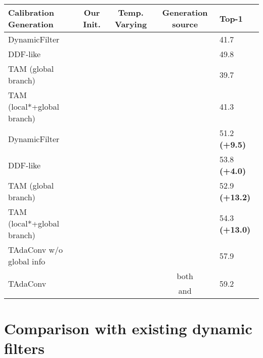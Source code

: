 \documentclass[10pt,journal,compsoc]{IEEEtran}
\newcommand{\cmark}{\color{good}\ding{51}}\newcommand{\xmark}{\color{bad}\ding{55}}
\newcommand{\tablestyle}[2]{\setlength{\tabcolsep}{#1}\renewcommand{\arraystretch}{#2}\centering\small}
\begin{document}
\begin{table*}[t]
    \tablestyle{5pt}{1.0}
\caption{{Performance comparison with other dynamic filters.
\textit{Our Init.} denotes initializing the calibration weights to ones so that the initial calibrated weights is identical to the pre-trained weights. Temp. Varying is short for temporally varying, which indicates different weights for different temporal locations (frames).
* denotes that the branch was originally not designed for generating filter or calibration weights, but we slightly modified the structure so that it can be used for calibration weight generation. \textbf{\color{forestgreen}(Numbers in brackets)} show the performance improvement brought by our initialization scheme for calibration weights.}
}
\centering
\begin{tabular}{lcccl}
\toprule
\textbf{Calibration Generation} & \textbf{Our Init.} & \textbf{Temp. Varying} & \textbf{Generation source} & \textbf{Top-1} \\
\midrule
DynamicFilter & \xmark & \xmark &  & 41.7 \\
DDF-like & \xmark & \cmark &  & 49.8 \\
TAM (global branch) & \xmark & \xmark &  & 39.7 \\
TAM (local*+global branch) & \xmark & \cmark &  & 41.3 \\
\midrule
DynamicFilter & \cmark  & \xmark &  & 51.2 \textbf{\color{forestgreen}(+9.5)} \\
DDF-like & \cmark  & \cmark &  & 53.8 \textbf{\color{forestgreen}(+4.0)} \\
TAM (global branch) & \cmark & \xmark &  & 52.9 \textbf{\color{forestgreen}(+13.2)}\\
TAM (local*+global branch) & \cmark & \cmark &  & 54.3 \textbf{\color{forestgreen}(+13.0)}\\
\midrule
TAdaConv w/o global info  & \cmark & \cmark &   & 57.9 \\
\midrule
\multirow{2}{*}{TAdaConv} & \multirow{2}{*}{\cmark} & \multirow{2}{*}{\cmark} & both   & \multirow{2}{*}{59.2} \\
~ & ~ & ~ & and  & ~\\
\bottomrule
\end{tabular}
\label{tab:compdyconvperf}
\end{table*}

\section{Comparison with existing dynamic filters}
\label{appendix:comparisondynamicfilter}
\end{document}
